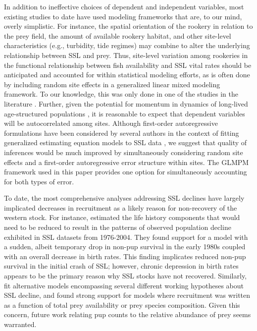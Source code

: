 \documentclass[nonumbib,leqno]{nrc1}
\begin{document}
In addition to ineffective choices of dependent and independent variables, most existing studies to date have used
modeling frameworks that are, to our mind, overly simplistic.  For instance, the spatial orientation of the rookery in relation to the prey field, the amount of available rookery habitat, and other site-level characteristics (e.g., turbidity, tide regimes) may combine to alter the underlying relationship between SSL and prey. Thus, site-level variation among rookeries in the functional relationship between fish availability and SSL vital rates should be anticipated and accounted for within statistical modeling efforts, as is often done by including random site effects in a generalized linear mixed modeling \citep{McCulloch2006} framework.  To our knowledge, this was only done in one of the studies in the literature \citep[i.e.,][]{Hui:2011uq}.  Further, given the potential for momentum in dynamics of long-lived age-structured populations \citep[see e.g.,][for a review]{EzardEtAl2010}, it is reasonable to expect that dependent variables will be autocorrelated among sites.  Although first-order autoregressive formulations have been considered by several authors in the context of fitting generalized estimating equation models to SSL data \citep[e.g.,][]{Dillingham:2006fv,Trites:2010ly}, we suggest that quality of inferences would be much improved by simultaneously considering random site effects and a first-order autoregressive error structure within sites.  The GLMPM framework used in this paper provides one option for simultaneously accounting for both types of error.

To date, the most comprehensive analyses addressing SSL declines have largely implicated decreases in recruitment as a likely reason for non-recovery of the western stock.  For instance, \citet{HolmesEtAl2007} estimated the life history components that would need to be reduced to result in
the patterns of observed population decline exhibited in SSL datasets from 1976-2004.  They found support for a model with a sudden, albeit temporary drop in non-pup survival in the early 1980s coupled with an overall decrease in birth rates.  This finding implicates reduced non-pup survival in the initial crash of SSL; however, chronic depression in birth rates appears to be the primary reason why SSL stocks have not recovered.  Similarly, \citet{Wolf:2008qf} fit alternative models encompassing several different working hypotheses about SSL decline, and found strong support for models where recruitment was written as a function of total prey availability or prey species composition.  Given this concern, future work relating pup counts to the relative abundance of prey seems warranted.
\end{document}
